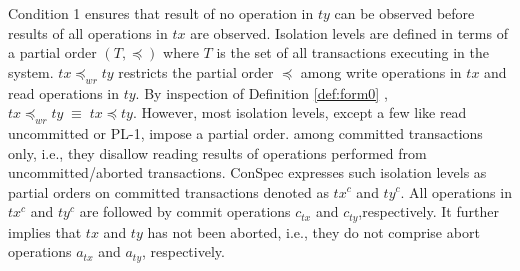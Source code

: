 \documentclass[acmlarge, ,11pt]{acmart}
\begin{document}
Condition 1 ensures  that result of no operation in  ${\mathit{ty}} $ can be observed before results of all operations in ${\mathit{tx}}$ are observed. 
 Isolation levels are defined in terms of a partial order $\left( T, \preccurlyeq \right)$ 
 where $T$ is the set of all transactions executing in the system.   $\mathit{tx} \preccurlyeq_{\mathit{wr}} \mathit{ty}$ restricts the partial order $\preccurlyeq$ among write operations in $\mathit{tx}$ and read operations in $\mathit{ty}$. By inspection of Definition \ref{def:form0} , $\mathit{tx} \preccurlyeq_{\mathit{wr}} \mathit{ty}  \;  \equiv \; \mathit{tx} \preccurlyeq \mathit{ty} $.  
However, most isolation levels, except a few like read uncommitted or PL-1, impose a partial order. among committed transactions only, i.e., they disallow reading results of operations performed from uncommitted/aborted transactions. ConSpec expresses such isolation levels as partial orders on committed transactions denoted as $\mathit{tx}^{c}$ and $\mathit{ty}^{c}$.  All operations in $\mathit{tx}^{c}$ and $\mathit{ty}^{c}$ are followed by commit operations $c_\mathit{tx}$ and $c_\mathit{ty}$,respectively. It further implies that $\mathit{tx}$ and $\mathit{ty}$ has not been aborted, i.e., they do not comprise abort operations $a_\mathit{tx}$ and $a_\mathit{ty}$, respectively.
  
\end{document}
